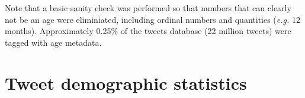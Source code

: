 \documentclass[a4paper,12pt,twoside,openright]{report}
\newcommand{\ti}{\textit}
\begin{document}
\noindent Note that a basic sanity check was performed so that numbers that can clearly not be an age were eliminiated, including ordinal numbers and quantities (\ti{e.g.} {12 months}). Approximately 0.25\% of the tweets database (22 million tweets) were tagged with age metadata.

\section{Tweet demographic statistics}

\end{document}
